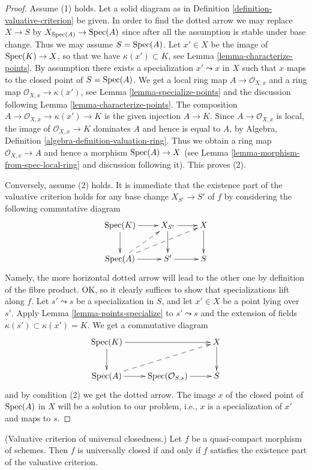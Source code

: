 \begin{proof}
Assume (1) holds. Let a solid diagram as in
Definition \ref{definition-valuative-criterion} be given.
In order to find the dotted arrow we may replace $X \to S$
by $X_{\mathop{\rm Spec}(A)} \to \mathop{\rm Spec}(A)$ since after all
the assumption is stable under base change.
Thus we may assume $S = \mathop{\rm Spec}(A)$.
Let $x' \in X$ be the image of $\mathop{\rm Spec}(K) \to X$, so
that we have $\kappa(x') \subset K$, see
Lemma \ref{lemma-characterize-points}.
By assumption there exists a specialization $x' \leadsto x$
in $X$ such that $x$ maps to the closed point of $S = \mathop{\rm Spec}(A)$.
We get a local ring map $A \to \mathcal{O}_{X, x}$ and a ring
map $\mathcal{O}_{X, x} \to \kappa(x')$, see
Lemma \ref{lemma-specialize-points} and the discussion following
Lemma \ref{lemma-characterize-points}. The composition
$A \to \mathcal{O}_{X, x} \to \kappa(x') \to K$ is the
given injection $A \to K$. Since $A \to \mathcal{O}_{X, x}$
is local, the image of $\mathcal{O}_{X, x} \to K$
dominates $A$ and hence is equal to $A$, by
Algebra, Definition \ref{algebra-definition-valuation-ring}.
Thus we obtain a ring map $\mathcal{O}_{X, x} \to A$ and
hence a morphism $\mathop{\rm Spec}(A) \to X$
(see Lemma \ref{lemma-morphism-from-spec-local-ring} and
discussion following it). This proves (2).

\medskip\noindent
Conversely, assume (2) holds. It is immediate that
the existence part of the valuative criterion holds for
any base change $X_{S'} \to S'$ of $f$ by considering
the following commutative diagram
$$
\xymatrix{
\Spec(K) \ar[r] \ar[d] & X_{S'} \ar[r] \ar[d] & X \ar[d] \\
\Spec(A) \ar[r] \ar@{-->}[ru] \ar@{-->}[rru] & S' \ar[r] & S
}
$$
Namely, the more horizontal dotted arrow will lead to the
other one by definition of the fibre product. OK, so it clearly
suffices to show that specializations lift along $f$.
Let $s' \leadsto s$ be a specialization in $S$, and let
$x' \in X$ be a point lying over $s'$. Apply
Lemma \ref{lemma-points-specialize}
to $s' \leadsto s$ and the extension of fields
$\kappa(s') \subset \kappa(x') = K$.
We get a commutative diagram
$$
\xymatrix{
\Spec(K) \ar[rr] \ar[d] & & X \ar[d] \\
\Spec(A) \ar[r] \ar@{-->}[rru] &
\Spec(\mathcal{O}_{S, s}) \ar[r] & S
}
$$
and by condition (2) we get the dotted arrow.
The image $x$ of the closed point of $\mathop{\rm Spec}(A)$
in $X$ will be a solution to our problem, i.e.,
$x$ is a specialization of $x'$ and maps to $s$.
\end{proof}

\begin{proposition}
\label{proposition-characterize-universally-closed}
(Valuative criterion of universal closedness.)
Let $f$ be a quasi-compact morphism of schemes.
Then $f$ is universally closed if and only if $f$
satisfies the existence part of the valuative criterion.
\end{proposition}

